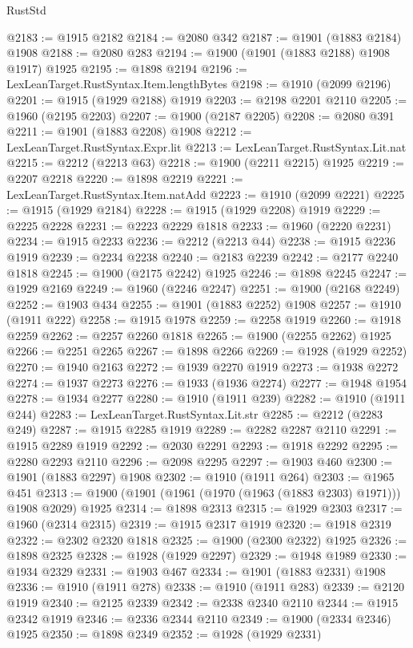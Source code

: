 \begin{lexlean}{RustStd}
\begin{coremodule}
@2183 := @1915 @2182
@2184 := @2080 @342
@2187 := @1901 (@1883 @2184) @1908
@2188 := @2080 @283
@2194 := @1900 (@1901 (@1883 @2188) @1908 @1917) @1925
@2195 := @1898 @2194
@2196 := LexLeanTarget.RustSyntax.Item.lengthBytes
@2198 := @1910 (@2099 @2196)
@2201 := @1915 (@1929 @2188) @1919
@2203 := @2198 @2201 @2110
@2205 := @1960 (@2195 @2203)
@2207 := @1900 (@2187 @2205)
@2208 := @2080 @391
@2211 := @1901 (@1883 @2208) @1908
@2212 := LexLeanTarget.RustSyntax.Expr.lit
@2213 := LexLeanTarget.RustSyntax.Lit.nat
@2215 := @2212 (@2213 @63)
@2218 := @1900 (@2211 @2215) @1925
@2219 := @2207 @2218
@2220 := @1898 @2219
@2221 := LexLeanTarget.RustSyntax.Item.natAdd
@2223 := @1910 (@2099 @2221)
@2225 := @1915 (@1929 @2184)
@2228 := @1915 (@1929 @2208) @1919
@2229 := @2225 @2228
@2231 := @2223 @2229 @1818
@2233 := @1960 (@2220 @2231)
@2234 := @1915 @2233
@2236 := @2212 (@2213 @44)
@2238 := @1915 @2236 @1919
@2239 := @2234 @2238
@2240 := @2183 @2239
@2242 := @2177 @2240 @1818
@2245 := @1900 (@2175 @2242) @1925
@2246 := @1898 @2245
@2247 := @1929 @2169
@2249 := @1960 (@2246 @2247)
@2251 := @1900 (@2168 @2249)
@2252 := @1903 @434
@2255 := @1901 (@1883 @2252) @1908
@2257 := @1910 (@1911 @222)
@2258 := @1915 @1978
@2259 := @2258 @1919
@2260 := @1918 @2259
@2262 := @2257 @2260 @1818
@2265 := @1900 (@2255 @2262) @1925
@2266 := @2251 @2265
@2267 := @1898 @2266
@2269 := @1928 (@1929 @2252)
@2270 := @1940 @2163
@2272 := @1939 @2270 @1919
@2273 := @1938 @2272
@2274 := @1937 @2273
@2276 := @1933 (@1936 @2274)
@2277 := @1948 @1954
@2278 := @1934 @2277
@2280 := @1910 (@1911 @239)
@2282 := @1910 (@1911 @244)
@2283 := LexLeanTarget.RustSyntax.Lit.str
@2285 := @2212 (@2283 @249)
@2287 := @1915 @2285 @1919
@2289 := @2282 @2287 @2110
@2291 := @1915 @2289 @1919
@2292 := @2030 @2291
@2293 := @1918 @2292
@2295 := @2280 @2293 @2110
@2296 := @2098 @2295
@2297 := @1903 @460
@2300 := @1901 (@1883 @2297) @1908
@2302 := @1910 (@1911 @264)
@2303 := @1965 @451
@2313 := @1900 (@1901 (@1961 (@1970 (@1963 (@1883 @2303) @1971))) @1908 @2029) @1925
@2314 := @1898 @2313
@2315 := @1929 @2303
@2317 := @1960 (@2314 @2315)
@2319 := @1915 @2317 @1919
@2320 := @1918 @2319
@2322 := @2302 @2320 @1818
@2325 := @1900 (@2300 @2322) @1925
@2326 := @1898 @2325
@2328 := @1928 (@1929 @2297)
@2329 := @1948 @1989
@2330 := @1934 @2329
@2331 := @1903 @467
@2334 := @1901 (@1883 @2331) @1908
@2336 := @1910 (@1911 @278)
@2338 := @1910 (@1911 @283)
@2339 := @2120 @1919
@2340 := @2125 @2339
@2342 := @2338 @2340 @2110
@2344 := @1915 @2342 @1919
@2346 := @2336 @2344 @2110
@2349 := @1900 (@2334 @2346) @1925
@2350 := @1898 @2349
@2352 := @1928 (@1929 @2331)

\end{coremodule}
\end{lexlean}
